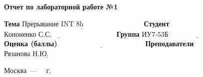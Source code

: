 \begin{titlepage}
	
	\begin{center}
		\Large\textbf{Отчет по лабораторной работе №1}\newline
	\end{center}
	
	\noindent\textbf{Тема} $\underline{\text{Прерывание INT 8h~~~~~~~~~~~~~~~~~~~~~~~~~}}$\newline\newline\newline
	\noindent\textbf{Студент} $\underline{\text{Кононенко С.С.~~~~~~~~~~~~~~~~~~~~~~~~~~~}}$\newline\newline
	\noindent\textbf{Группа} $\underline{\text{ИУ7-53Б~~~~~~~~~~~~~~~~~~~~~~~~~~~~~~~~~~~~~}}$\newline\newline
	\noindent\textbf{Оценка (баллы)} $\underline{\text{~~~~~~~~~~~~~~~~~~~~~~~~~~~~~~~~~~~~}}$\newline\newline
	\noindent\textbf{Преподаватели} $\underline{\text{Рязанова Н.Ю.~~~~~~~~~~~~~~~~~~}}$\newline
	
	\begin{center}
		\vfill
		Москва~---~\the\year
		~г.
	\end{center}
 \restoregeometry
\end{titlepage}
